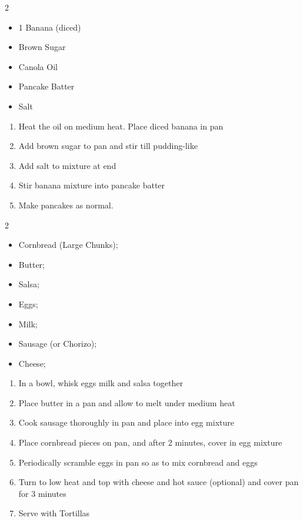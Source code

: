 \documentclass[oneside]{recipe}
\newcommand{\recipecolumn}[2]{
	\begin{multicols}{2}
	\raggedcolumns
	#1
	\columnbreak
	#2
	\end{multicols}
}
\begin{document}
\newpage
{}
\recipecolumn{
	\begin{itemize}
		\item 1 Banana (diced)
		\item Brown Sugar
		\item Canola Oil
		\item Pancake Batter
		\item Salt
	\end{itemize}
}{
	\begin{enumerate}
	\item Heat the oil on medium heat. Place diced banana in pan
	\item Add brown sugar to pan and stir till pudding-like 
	\item Add salt to mixture at end
	\item Stir banana mixture into pancake batter
	\item Make pancakes as normal.
	\end{enumerate}	
}

\recipecolumn{
	\begin{itemize}
		\item Cornbread (Large Chunks);
		\item Butter;
		\item Salsa;
		\item Eggs;
		\item Milk;
		\item Sausage (or Chorizo);
		\item Cheese;
	\end{itemize}
}{
	\begin{enumerate}
		\item In a bowl, whisk eggs milk and salsa together
		\item Place butter in a pan and allow to melt under medium heat
		\item Cook sausage thoroughly in pan and place into egg mixture
		\item Place cornbread pieces on pan, and after 2 minutes, cover in egg mixture
		\item Periodically scramble eggs in pan so as to mix cornbread and eggs
		\item Turn to low heat and top with cheese and hot sauce (optional) and cover pan for 3 minutes
		\item Serve with Tortillas
	\end{enumerate}
} 

\end{document}
